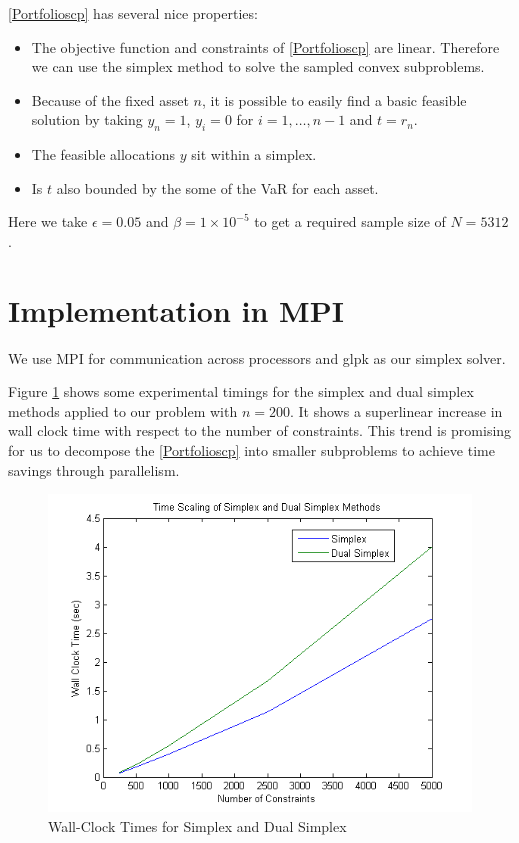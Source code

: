 \documentclass[12pt]{article}
\begin{document}
\ref{Portfolioscp} has several nice properties:
\begin{itemize}
\item The objective function and constraints of \ref{Portfolioscp} are linear. Therefore we can use the simplex method to solve the sampled convex subproblems.
\item Because of the fixed asset $n$, it is possible to easily find a basic feasible solution by taking $y_n = 1$, $y_i = 0$ for $i = 1, \ldots, n-1$ and $t = r_n$.
\item The feasible allocations $y$ sit within a simplex.
\item Is $t$ also bounded by the some of the VaR for each asset.
\end{itemize}

Here we take $\epsilon = 0.05$ and $\beta = 1 \times 10^{-5}$ to get a required sample size of $N = 5312$.

\section*{Implementation in MPI}

We use MPI for communication across processors and glpk as our simplex solver.


Figure \ref{fig:fig_simplex_time} shows some experimental timings for the simplex and dual simplex methods applied to our problem with $n = 200$.
It shows a superlinear increase in wall clock time with respect to the number of constraints.
This trend is promising for us to decompose the \ref{Portfolioscp} into smaller subproblems to achieve time savings through parallelism.

\begin{figure}[ht]
	\centering
		\includegraphics{../plot/figs/fig_simplex_time.png}
	\caption{Wall-Clock Times for Simplex and Dual Simplex}
	\label{fig:fig_simplex_time}
\end{figure}
\end{document}
